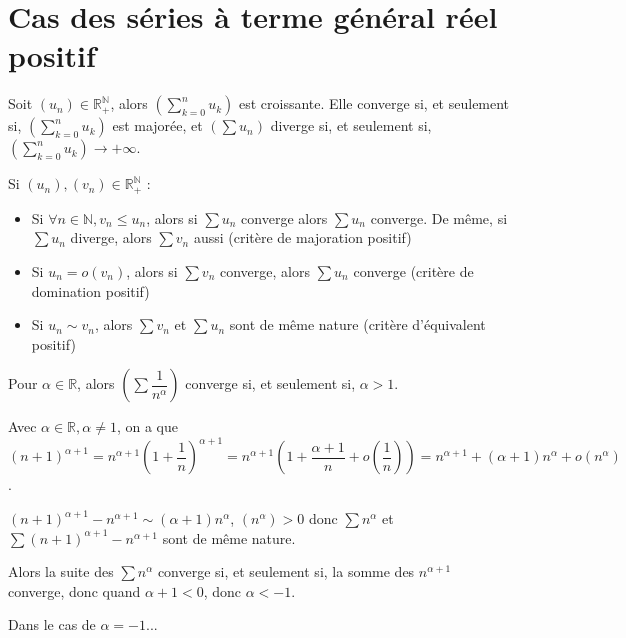\documentclass[a4paper,12pt]{book}
\newcommand{\Def}[2]{\begin{tcolorbox}[sharp corners, colback=white,colframe=blue!90!black!75, title=Définition : #1]#2\end{tcolorbox}}
\newcommand{\Thr}[2]{\begin{tcolorbox}[sharp corners, colback=white,colframe=red!90!black!75, title=Théorème : #1]#2\end{tcolorbox}}
\newcommand{\Pre}[1]{\begin{tcolorbox}[sharp corners, colback=white,colframe=green!60!green!30!black!75, title=Preuve]#1\end{tcolorbox}}
\def\R{\mathbb{R}}
\def\N{\mathbb{N}}
\begin{document}
\section{Cas des séries à terme général réel positif}
\Def{Série à terme général réel positif}{Soit $(u_n)\in\R_+^\N$, alors $(\sum\limits_{k=0}^n u_k)$ est croissante. Elle converge si, et seulement si, $(\sum\limits_{k=0}^n u_k)$ est majorée, et $(\sum u_n)$ diverge si, et seulement si, $(\sum\limits_{k=0}^n u_k)\to +\infty$.}
\Thr{Critères de convergence d'une série}{Si $(u_n), (v_n)\in\R_+^\N$ : \begin{itemize}
\item Si $\forall n\in\N, v_n\leq u_n$, alors si $\sum u_n$ converge alors $\sum u_n$ converge. De même, si $\sum u_n$ diverge, alors $\sum v_n$ aussi (critère de majoration positif)
\item Si $u_n = o(v_n)$, alors si $\sum v_n$ converge, alors $\sum u_n$ converge (critère de domination positif)
\item Si $u_n\sim v_n$, alors $\sum v_n$ et $\sum u_n$ sont de même nature (critère d'équivalent positif)\end{itemize}}
\Thr{Séries de Riemann}{Pour $\alpha\in\R$, alors $(\sum \dfrac{1}{n^\alpha})$ converge si, et seulement si, $\alpha>1$.}
\Pre{Avec $\alpha\in\R,\alpha\neq1$, on a que $(n+1)^{\alpha+1}=n^{\alpha +1}(1+\dfrac{1}{n})^{\alpha+1} = n^{\alpha+1}(1+\dfrac{\alpha +1}{n} + o(\dfrac{1}{n})) = n^{\alpha+1} + (\alpha+1)n^\alpha + o(n^\alpha)$.
\par $(n+1)^{\alpha+1} - n^{\alpha+1}\sim  (\alpha+1)n^\alpha$, $(n^\alpha)>0$ donc $\sum n^\alpha$ et $\sum (n+1)^{\alpha+1} - n^{\alpha+1}$ sont de même nature.
\par Alors la suite des $\sum n^\alpha$ converge si, et seulement si, la somme des $n^{\alpha+1}$ converge, donc quand $\alpha+1<0$, donc $\alpha<-1$.
\par Dans le cas de $\alpha =-1$...}
\end{document}
